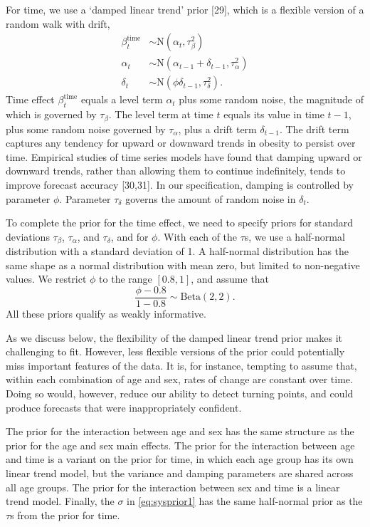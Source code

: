 \documentclass[10pt,letterpaper]{article}
\begin{document}
For time, we use a `damped linear trend' prior {[}29{]}, which is a
flexible version of a random walk with drift, \begin{align}
  \beta_t^{\text{time}} & \sim \text{N}(\alpha_t, \tau_{\beta}^2) \label{eq:sysmodtime1} \\
  \alpha_t & \sim \text{N}(\alpha_{t-1} + \delta_{t-1}, \tau_{\alpha}^2) \\
  \delta_t & \sim \text{N}(\phi \delta_{t-1}, \tau_{\delta}^2).
\end{align} Time effect \(\beta_t^{\text{time}}\) equals a level term
\(\alpha_t\) plus some random noise, the magnitude of which is governed
by \(\tau_{\beta}\). The level term at time \(t\) equals its value in
time \(t-1\), plus some random noise governed by \(\tau_{\alpha}\), plus
a drift term \(\delta_{t-1}\). The drift term captures any tendency for
upward or downward trends in obesity to persist over time. Empirical
studies of time series models have found that damping upward or downward
trends, rather than allowing them to continue indefinitely, tends to
improve forecast accuracy {[}30,31{]}. In our specification, damping is
controlled by parameter \(\phi\). Parameter \(\tau_{\delta}\) governs
the amount of random noise in \(\delta_t\).

To complete the prior for the time effect, we need to specify priors for
standard deviations \(\tau_{\beta}\), \(\tau_{\alpha}\), and
\(\tau_{\delta}\), and for \(\phi\). With each of the \(\tau\)s, we use
a half-normal distribution with a standard deviation of 1. A half-normal
distribution has the same shape as a normal distribution with mean zero,
but limited to non-negative values. We restrict \(\phi\) to the range
\([0.8, 1]\), and assume that \begin{equation}
  \frac{\phi - 0.8}{1 - 0.8} \sim \text{Beta}(2, 2).
\end{equation} All these priors qualify as weakly informative.

As we discuss below, the flexibility of the damped linear trend prior
makes it challenging to fit. However, less flexible versions of the
prior could potentially miss important features of the data. It is, for
instance, tempting to assume that, within each combination of age and
sex, rates of change are constant over time. Doing so would, however,
reduce our ability to detect turning points, and could produce forecasts
that were inappropriately confident.

The prior for the interaction between age and sex has the same structure
as the prior for the age and sex main effects. The prior for the
interaction between age and time is a variant on the prior for time, in
which each age group has its own linear trend model, but the variance
and damping parameters are shared across all age groups. The prior for
the interaction between sex and time is a linear trend model. Finally,
the \(\sigma\) in \eqref{eq:sysprior1} has the same half-normal prior as
the \(\tau\)s from the prior for time.
\end{document}
